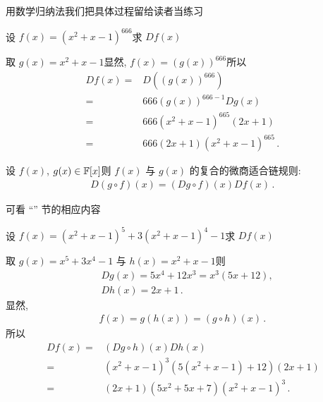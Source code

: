 \begin{pf}
    用数学归纳法\period 我们把具体过程留给读者当练习\period
\end{pf}

\begin{example}
    设 $f(x) = (x^2 + x - 1)^{666}$\period 求 $Df(x)$\period

    取 $g(x) = x^2 + x - 1$\period 显然, $f(x) = (g(x))^{666}$\period 所以
    \begin{align*}
        Df(x)
        = {} & D((g(x))^{666})                          \\
        = {} & 666 (g(x))^{666 - 1} Dg(x)               \\
        = {} & 666 (x^2 + x - 1)^{665} (2x + 1)         \\
        = {} & 666 (2x + 1) (x^2 + x - 1)^{665} \period
    \end{align*}
\end{example}

\begin{proposition}
    设 $f(x)$, $g(x) \in \mathbb{F}[x]$\period 则 $f(x)$ 与 $g(x)$ 的复合的微商适合链规则:
    \begin{align*}
        D(g \circ f) (x) = (Dg \circ f)(x) Df (x) \period
    \end{align*}
\end{proposition}

\begin{pf}
    可看 ``\Derivatives '' 节的相应内容\period
\end{pf}

\begin{example}
    设 $f(x) = (x^2 + x - 1)^5 + 3 (x^2 + x - 1)^4 - 1$\period 求 $Df(x)$\period

    取 $g(x) = x^5 + 3x^4 - 1$ 与 $h(x) = x^2 + x - 1$\period 则
    \begin{align*}
         & Dg(x) = 5x^4 + 12x^3 = x^3 (5x + 12), \\
         & Dh(x) = 2x + 1 \period
    \end{align*}
    显然,
    \begin{align*}
        f(x) = g(h(x)) = (g \circ h) (x) \period
    \end{align*}
    所以
    \begin{align*}
        Df(x)
        = {} & (Dg \circ h)(x) Dh(x)                            \\
        = {} & (x^2 + x - 1)^3 (5(x^2 + x - 1) + 12) (2x + 1)   \\
        = {} & (2x + 1) (5x^2 + 5x + 7) (x^2 + x - 1)^3 \period
    \end{align*}
\end{example}

